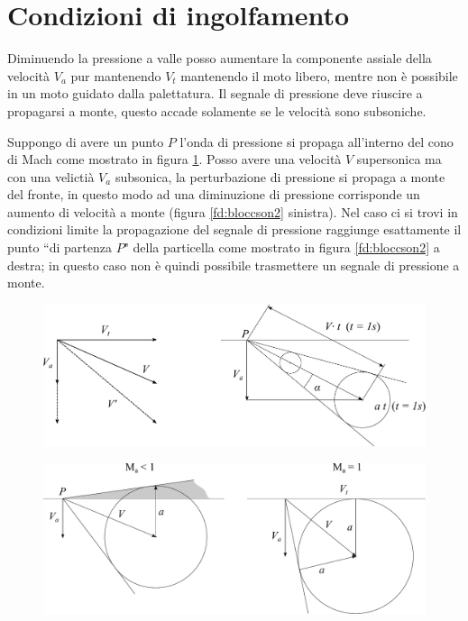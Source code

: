 \section{Condizioni di ingolfamento}
Diminuendo la pressione a valle posso aumentare la componente assiale della velocità $V_a$ pur mantenendo $V_t$ mantenendo il moto libero, mentre non è possibile in un moto guidato dalla palettatura. Il segnale di pressione deve riuscire a propagarsi a monte, questo accade solamente se le velocità sono subsoniche. 

Suppongo di avere un punto $P$ l'onda di pressione si propaga all'interno del cono di Mach come mostrato in figura \ref{fd:bloccson1}. Posso avere una velocità $V$ supersonica ma con una velictià $V_a$ subsonica, la perturbazione di pressione si propaga a monte del fronte, in questo modo ad una diminuzione di pressione corrisponde un aumento di velocità a monte (figura \ref{fd:bloccson2} sinistra). Nel caso ci si trovi in condizioni limite la propagazione del segnale di pressione raggiunge esattamente il punto ``di partenza $P$" della particella come mostrato in figura \ref{fd:bloccson2} a destra; in questo caso non è quindi possibile trasmettere un segnale di pressione a monte. 
\begin{figure}
\centering
  \includegraphics[width=.8\textwidth]{fig/bloccson1.pdf}
\caption{}
\label{fd:bloccson1}
\end{figure}
\begin{figure}
\centering
  \includegraphics[width=.8\textwidth]{fig/bloccson2.pdf}
\caption{}
\label{fig:bloccson2}
\end{figure}
